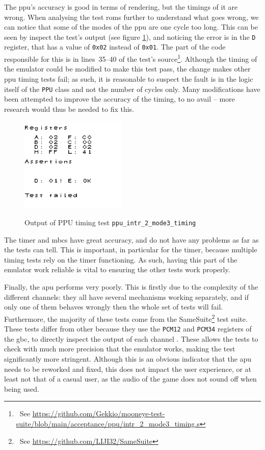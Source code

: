 \documentclass[11pt]{informatics-report}
\newcommand{\ftnt}[1]{\footnote{~See \url{#1}}}
\begin{document}
The \gls{ppu}'s accuracy is good in terms of rendering, but the timings of it are wrong. When analysing the test \glspl{rom} further to understand what goes wrong, we can notice that some of the modes of the \gls{ppu} are one cycle too long. This can be seen by inspect the test's output (see figure \ref{fig:failed-ppu-timing-test}), and noticing the error is in the \texttt{D} register, that has a value of \texttt{0x02} instead of \texttt{0x01}. The part of the code responsible for this is in lines~35--40 of the test's source\ftnt{https://github.com/Gekkio/mooneye-test-suite/blob/main/acceptance/ppu/intr\_2\_mode3\_timing.s}. Although the timing of the emulator could be modified to make this test pass, the change makes other \gls{ppu} timing tests fail; as such, it is reasonable to suspect the fault is in the logic itself of the \texttt{PPU} class and not the number of cycles only. Many modifications have been attempted to improve the accuracy of the timing, to no avail -- more research would thus be needed to fix this.

\begin{figure}[h]
    \centering
    \includegraphics[width=5cm]{images/failed-ppu-timing-test}\\
    \caption{Output of PPU timing test \texttt{ppu\_intr\_2\_mode3\_timing}}
    \label{fig:failed-ppu-timing-test}
\end{figure}

The timer and \glspl{mbc} have great accuracy, and do not have any problems as far as the tests can tell. This is important, in particular for the timer, because multiple timing tests rely on the timer functioning. As such, having this part of the emulator work reliable is vital to ensuring the other tests work properly.

Finally, the \gls{apu} performs very poorly. This is firstly due to the complexity of the different channels: they all have several mechanisms working separately, and if only one of them behaves wrongly then the whole set of tests will fail. Furthermore, the majority of these tests come from the SameSuite\ftnt{https://github.com/LIJI32/SameSuite} test suite. These tests differ from other because they use the \texttt{PCM12} and \texttt{PCM34} registers of the \gls{gbc}, to directly inspect the output of each channel \cite[Audio Details]{pandoc}. These allows the tests to check with much more precision that the emulator works, making the test significantly more stringent. Although this is an obvious indicator that the \gls{apu} needs to be reworked and fixed, this does not impact the user experience, or at least not that of a casual user, as the audio of the game does not sound off when being used.
\end{document}
